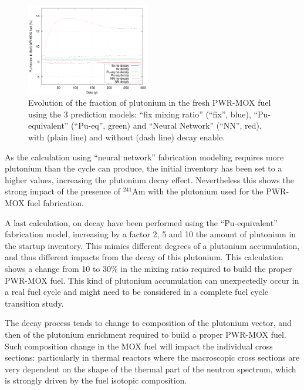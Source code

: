 \documentclass{anstrans}
\begin{document}
\begin{figure}[ht] %
  \centering
  \includegraphics[width=0.48\textwidth]{decay_pu_contribution.png}
  \caption{Evolution of the fraction of plutonium in the fresh PWR-MOX fuel
    using the 3 prediction models: ``fix mixing ratio'' (``fix'', blue),
    ``Pu-equivalent'' (``Pu-eq'', green) and ``Neural Network'' (``NN'', red),
    with (plain line) and without (dash line) decay enable.} 
  \label{fig:d}
\end{figure}


As the calculation using ``neural network'' fabrication modeling requires more
plutonium than the cycle can produce, the initial inventory has been set to a
higher values, increasing the plutonium decay effect. Nevertheless this shows
the strong impact of the presence of $^{241}$Am with the plutonium used for the
PWR-MOX fuel fabrication.


A last calculation, on decay have been performed using the ``Pu-equivalent''
fabrication model, increasing by a factor 2, 5 and 10 the amount of plutonium in
the startup inventory.  This mimics different degrees of a plutonium accumulation,
and thus different impacts from the decay of this plutonium.
This calculation shows a change from 10 to 30\% in the mixing ratio required to
build the proper PWR-MOX fuel. This kind of plutonium accumulation can
unexpectedly occur in a real fuel cycle and might need to be considered in a
complete fuel cycle transition study.


The decay process tends to change to composition of the plutonium vector, and
then of the plutonium enrichment required to build a proper PWR-MOX fuel.  Such
composition change in the MOX fuel will impact the individual cross sections:
particularly in thermal reactors where the macroscopic cross sections are very
dependent on the shape of the thermal part of the neutron spectrum, which is
strongly driven by the fuel isotopic composition.
\end{document}
